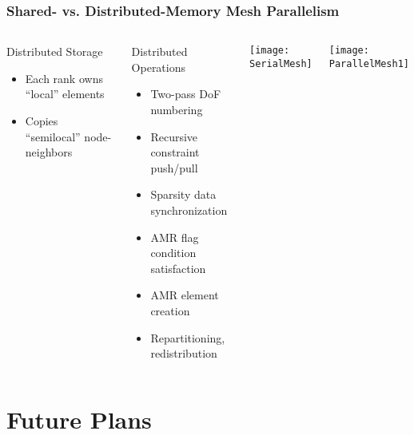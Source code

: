 \documentclass[mathserif]{beamer}
\begin{document}
\begin{frame}
\frametitle{Shared- vs. Distributed-Memory Mesh Parallelism}
\begin{columns}
\begin{block}{Distributed Storage}
	\begin{itemize}
		\item Each rank owns ``local'' elements
		\item Copies ``semilocal'' node-neighbors
	\end{itemize}
\end{block}
\begin{block}{Distributed Operations}
	\begin{itemize}
		\item Two-pass DoF numbering
		\item Recursive constraint push/pull
		\item Sparsity data synchronization
		\item AMR flag condition satisfaction
		\item AMR element creation
		\item Repartitioning, redistribution
	\end{itemize}
\end{block}
\center
\texttt{[image: SerialMesh]}

\center
\texttt{[image: ParallelMesh1]}
\end{columns}
\end{frame}



\section{Future Plans}
\end{document}
